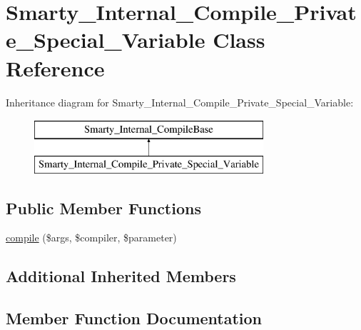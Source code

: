 \hypertarget{class_smarty___internal___compile___private___special___variable}{}\section{Smarty\+\_\+\+Internal\+\_\+\+Compile\+\_\+\+Private\+\_\+\+Special\+\_\+\+Variable Class Reference}
\label{class_smarty___internal___compile___private___special___variable}
Inheritance diagram for Smarty\+\_\+\+Internal\+\_\+\+Compile\+\_\+\+Private\+\_\+\+Special\+\_\+\+Variable\+:\begin{figure}[H]
\begin{center}
\leavevmode
\includegraphics[height=2.000000cm]{class_smarty___internal___compile___private___special___variable}
\end{center}
\end{figure}
\subsection*{Public Member Functions}
\begin{DoxyCompactItemize}
\item 
\hyperlink{class_smarty___internal___compile___private___special___variable_a84998958b9fc8c11c2ebe9620a49b853}{compile} (\$args, \$compiler, \$parameter)
\end{DoxyCompactItemize}
\subsection*{Additional Inherited Members}


\subsection{Member Function Documentation}
\hypertarget{class_smarty___internal___compile___private___special___variable_a84998958b9fc8c11c2ebe9620a49b853}{}
